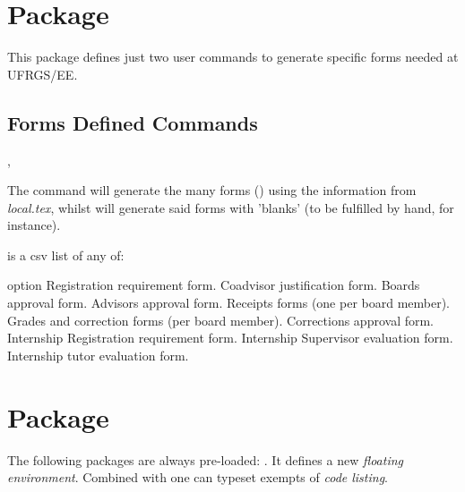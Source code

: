 \documentclass[article,nogeometry,english,tocdepth=3,secdepth=3]{ufrgscca} %
\begin{document}
\section{ Package}
This package defines just two user commands to generate specific forms needed at UFRGS/EE.
\subsection{Forms Defined Commands}\label{forms.commands}
\begin{codedescribe}{\tcforms,\tcemptyforms}
	\begin{codesyntax}%
\end{codesyntax}
The command \tsmacro{\tcforms}{} will generate the many forms () using the information from \emph{local.tex}, whilst \tsmacro{\tcemptyforms}{} will generate said forms with 'blanks' (to be fulfilled by hand, for instance).

 is a csv list of any of:
\begin{describelist*}{option}
     { Registration requirement form.}
     { Coadvisor justification form.}
     { Boards approval form.}
     { Advisors approval form.}
     { Receipts forms (one per board member).}
     { Grades and correction forms (per board member).}
     { Corrections approval  form.}
     { Internship Registration requirement form.}
     { Internship Supervisor evaluation form.}
     { Internship tutor evaluation form.}
\end{describelist*}

\end{codedescribe}


\section{ Package}
The following packages are always pre-loaded: .
It defines a new \emph{floating environment}. Combined with  one can typeset exempts of \emph{code listing}.
\end{document}
